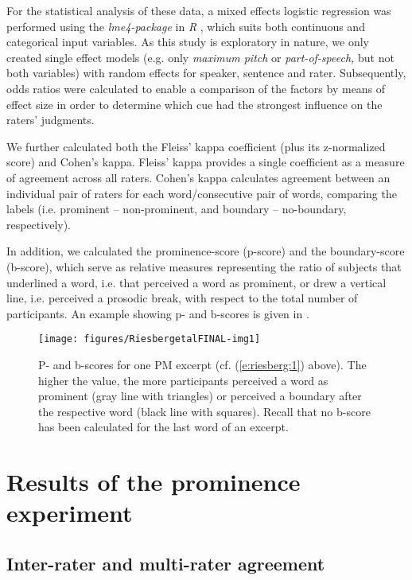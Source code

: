 \documentclass[output=paper
,modfonts
,nonflat]{langsci/langscibook}
\begin{document}
For the statistical analysis of these data, a mixed effects logistic regression was performed using the \textit{lme4-package} \citep{Bates2015} in \textit{R} \citep{R2015}, which suits both continuous and categorical input variables. As this study is exploratory in nature, we only created single effect models (e.g. only \textit{maximum pitch} or \textit{part-of-speech,} but not both variables) with random effects for speaker, sentence and rater. Subsequently, odds ratios were calculated to enable a comparison of the factors by means of effect size in order to determine which cue had the strongest influence on the raters’ judgments.

We further calculated both the Fleiss’ kappa coefficient (plus its z-normalized score) and Cohen’s kappa. Fleiss’ kappa provides a single coefficient as a measure of agreement across all raters. Cohen’s kappa calculates agreement between an individual pair of raters for each word/consecutive pair of words, comparing the labels (i.e. prominent – non-prominent, and boundary – no-boundary, respectively). 

In addition, we calculated the prominence-score (p-score) and the boundary-score (b-score), which serve as relative measures representing the ratio of subjects that underlined a word, i.e. that perceived a word as prominent, or drew a vertical line, i.e. perceived a prosodic break, with respect to the total number of participants. An example showing p- and b-scores is given in . 

\begin{figure}
		\texttt{[image: figures/RiesbergetalFINAL-img1]}
		\caption{P- and b-scores for one PM excerpt (cf. (\ref{e:riesberg:1}) above). The higher the value, the more participants perceived a word as prominent (gray line with triangles) or perceived a boundary after the respective word (black line with squares). Recall that no b-score has been calculated for the last word of an excerpt.}
		\label{f:riesberg:1}
\end{figure}

\section{\label{s:riesberg:3}Results of the prominence experiment}
	
\subsection{\label{s:riesberg:3.1}Inter-rater and multi-rater agreement}
\end{document}
